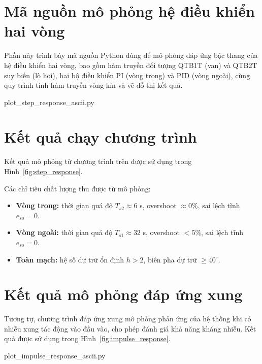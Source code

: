 \documentclass[../main.tex]{subfiles}
\begin{document}
\section{Mã nguồn mô phỏng hệ điều khiển hai vòng}

Phần này trình bày mã nguồn Python dùng để mô phỏng đáp ứng bậc thang của hệ điều khiển hai vòng, bao gồm hàm truyền đối tượng QTB1T (van) và QTB2T suy biến (lò hơi), hai bộ điều khiển PI (vòng trong) và PID (vòng ngoài), cùng quy trình tính hàm truyền vòng kín và vẽ đồ thị kết quả.


{plot_step_response_ascii.py}

\section{Kết quả chạy chương trình}

Kết quả mô phỏng từ chương trình trên được sử dụng trong Hình~\ref{fig:step_response}.

Các chỉ tiêu chất lượng thu được từ mô phỏng:

\begin{itemize}
    \item \textbf{Vòng trong:} thời gian quá độ $T_{s2} \approx 6$ s, overshoot $\approx 0\%$, sai lệch tĩnh $e_{ss} = 0$.
    \item \textbf{Vòng ngoài:} thời gian quá độ $T_{s1} \approx 32$ s, overshoot $< 5\%$, sai lệch tĩnh $e_{ss} = 0$.
    \item \textbf{Toàn mạch:} hệ số dự trữ ổn định $h > 2$, biên pha dự trữ $\geq 40^\circ$.
\end{itemize}

\section{Kết quả mô phỏng đáp ứng xung}

Tương tự, chương trình đáp ứng xung mô phỏng phản ứng của hệ thống khi có nhiễu xung tác động vào đầu vào, cho phép đánh giá khả năng kháng nhiễu. Kết quả được sử dụng trong Hình~\ref{fig:impulse_response}.


{plot_impulse_response_ascii.py}
\end{document}
